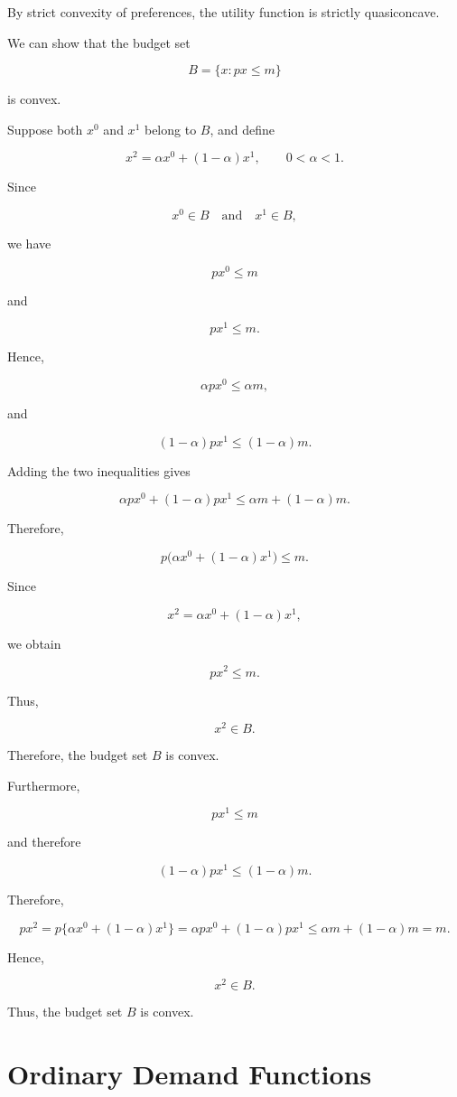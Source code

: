 By strict convexity of preferences, the utility function is strictly quasiconcave.

We can show that the budget set

\[
B
=
\{x : px \le m\}
\]

is convex.

Suppose both \(x^0\) and \(x^1\) belong to \(B\), and define

\[
x^2
=
\alpha x^0 + (1-\alpha)x^1,
\qquad
0 < \alpha < 1.
\]

Since

\[
x^0 \in B
\quad \text{and} \quad
x^1 \in B,
\]

we have

\[
px^0 \le m
\]

and

\[
px^1 \le m.
\]

Hence,

\[
\alpha px^0 \le \alpha m,
\]

and

\[
(1-\alpha)px^1 \le (1-\alpha)m.
\]

Adding the two inequalities gives

\[
\alpha px^0 + (1-\alpha)px^1
\le
\alpha m + (1-\alpha)m.
\]

Therefore,

\[
p\bigl(\alpha x^0 + (1-\alpha)x^1\bigr)
\le
m.
\]

Since

\[
x^2
=
\alpha x^0 + (1-\alpha)x^1,
\]

we obtain

\[
px^2 \le m.
\]

Thus,

\[
x^2 \in B.
\]

Therefore, the budget set \(B\) is convex.




Furthermore,

\[
px^1 \le m
\]

and therefore

\[
(1-\alpha)px^1 \le (1-\alpha)m.
\]

Therefore,

\[
px^2
=
p\{\alpha x^0 + (1-\alpha)x^1\}
=
\alpha px^0 + (1-\alpha)px^1
\le
\alpha m + (1-\alpha)m
=
m.
\]

Hence,

\[
x^2 \in B.
\]

Thus, the budget set \(B\) is convex.

\section{Ordinary Demand Functions}

